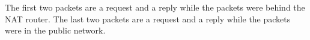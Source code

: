 
The first two packets are a request and a reply while the packets were behind the NAT router.
The last two packets are a request and a reply while the packets were in the public network.